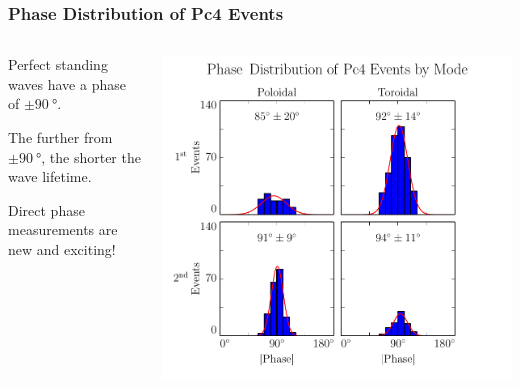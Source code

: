 \documentclass{beamer}
\begin{document}
\begin{frame}
\frametitle{Phase Distribution of Pc4 Events}

\vfill

\begin{columns}
\begin{wideitemize}
\item Perfect standing waves have a phase of $\pm\SI{90}{\degree}$. 
\item The further from $\pm\SI{90}{\degree}$, the shorter the wave lifetime. 
\item Direct phase measurements are new and exciting! 
\end{wideitemize}
\includegraphics[width=\textwidth]{figures/phase.pdf}
\end{columns}


\end{frame}
\end{document}
